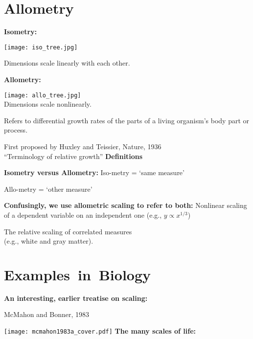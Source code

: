 \section{Allometry}      
  \small

  \textbf{Isometry:}
      
      \texttt{[image: iso\_tree.jpg]}
       
        Dimensions scale linearly with each other.
  

  \textbf{Allometry:}
      
      \texttt{[image: allo\_tree.jpg]}\\
       
        Dimensions scale nonlinearly.
  

  \textbf{}
      Refers to differential growth rates of the parts
      of a living organism's body part or process.
     
      First proposed by Huxley and Teissier, Nature, 1936\\
      ``Terminology of relative growth''\cite{huxley1936a,shingleton2010a}
  \textbf{Definitions}

  \textbf{Isometry versus Allometry:}
      Iso-metry = `same measure'
     
      Allo-metry = `other measure'
  \bigskip

  \textbf{Confusingly, we use allometric scaling to refer to both:}
      Nonlinear scaling of a dependent variable
      on an independent one (e.g., $y \propto x^{1/3}$)
    
      The relative scaling of correlated measures\\
      (e.g., white and gray matter).

\section{Examples\ in\ Biology}
  \textbf{An interesting, earlier treatise on scaling:}
    
    McMahon and Bonner, 1983\cite{mcmahon1983a}
    
    \texttt{[image: mcmahon1983a\_cover.pdf]}
  \textbf{The many scales of life:}
    
